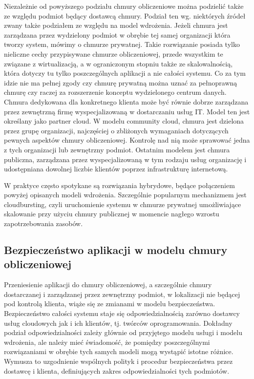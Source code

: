 	Niezależnie od powyższego podziału chmury obliczeniowe można podzielić także ze względu podmiot będący dostawcą chmury. Podział ten wg. niektórych źródeł zwany także podziałem ze względu na model wdrożenia. Jeżeli chmura jest zarządzana przez wydzielony podmiot w obrębie tej samej organizacji która tworzy system, mówimy o chmurze prywatnej. Takie rozwiązanie posiada tylko nieliczne cechy przypisywane chmurze obliczeniowej, przede wszystkim te związane z wirtualizacją, a w ograniczonym stopniu także ze skalowalnością, która dotyczy tu tylko poszczególnych aplikacji a nie całości systemu. Co za tym idzie nie ma pełnej zgody czy chmurę prywatną można  uznać za pełnoprawną chmurę czy raczej za rozszerzenie konceptu wydzielonego centrum danych.  Chmura dedykowana dla konkretnego klienta może być równie dobrze zarządzana przez zewnętrzną firmę wyspecjalizowaną w dostarczaniu usług IT. Model ten jest określany jako partner cloud. W modelu community cloud, chmura jest dzielona przez grupę organizacji, najczęściej o zbliżonych wymaganiach dotyczących pewnych aspektów chmury obliczeniowej. Kontrolę nad nią może sprawować jedna z tych organizacji lub zewnętrzny podmiot. Ostatnim modelem jest chmura publiczna, zarządzana przez wyspecjalizowaną w tym rodzaju usług organizację i udostępniana dowolnej liczbie klientów poprzez infrastrukturę internetową. 

	W praktyce często spotykane są rozwiązania hybrydowe, będące połączeniem powyżej opisanych modeli wdrożenia. Szczególnie popularnym mechanizmem jest cloudbursting, czyli uruchomienie systemu w chmurze prywatnej umożliwiające skalowanie przy użyciu chmury publicznej w momencie nagłego wzrostu zapotrzebowania zasobów.

		
	\subsection{Bezpieczeństwo aplikacji w modelu chmury obliczeniowej}
	
	Przeniesienie aplikacji do chmury obliczeniowej, a szczególnie chmury dostarczanej i zarządzanej przez zewnętrzny podmiot, w lokalizacji nie będącej pod kontrolą klienta, wiąże się ze zmianami w modelu bezpieczeństwa.  Bezpieczeństwo całości systemu staje się odpowiedzialnością zarówno dostawcy usług cloudowych jak i ich klientów, tj. twórców oprogramowania. Dokładny podział odpowiedzialności zależy głównie od przyjętego modelu usługi i modelu wdrożenia\cite{PCI13}, ale należy mieć świadomość, że pomiędzy poszczególnymi rozwiązaniami w obrębie tych samych modeli mogą wystąpić istotne różnice. Wymusza to uzgodnienie wspólnych polityk i procedur bezpieczeństwa przez dostawcę i klienta, definiujących zakres odpowiedzialności tych podmiotów. 

